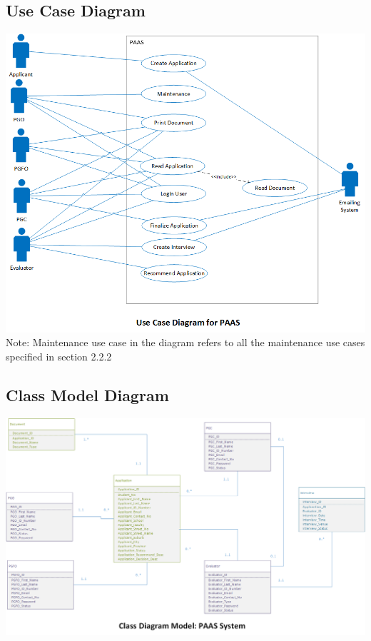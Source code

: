 \documentclass{article}
\begin{document}
\subsection{Use Case Diagram}
\includegraphics[scale=0.65]{UseCaseDiagram.png} \\
Note: Maintenance use case in the diagram refers to all the maintenance use cases specified in section 2.2.2
\subsection{Class Model Diagram}
\includegraphics[scale=0.5]{ERD.png} \\
\end{document}
